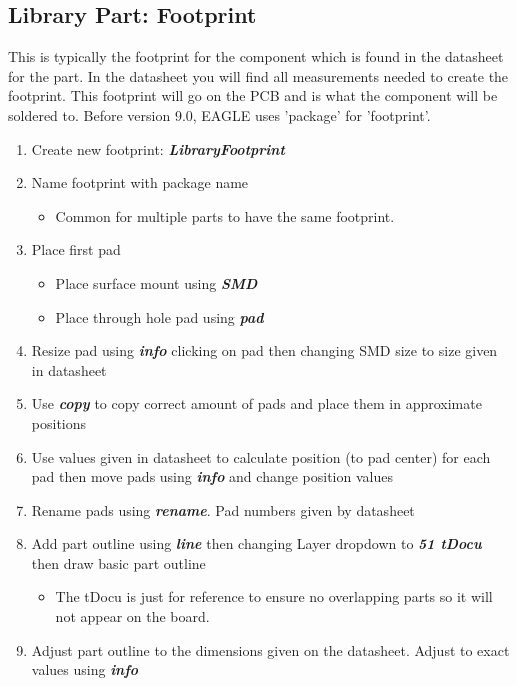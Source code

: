 \documentclass{article}
\begin{document}
\subsection{Library Part: Footprint}
This is typically the footprint for the component which is found in the datasheet for the part. In the datasheet you will find all measurements needed to create the footprint. This footprint will go on the PCB and is what the component will be soldered to. Before version 9.0, EAGLE uses 'package' for 'footprint'.  
\begin{enumerate}
    \item Create new footprint: \textit{\textbf{Library\textrightarrow Footprint}}
    \item Name footprint with package name
    \begin{itemize}
        \item Common for multiple parts to have the same footprint.
    \end{itemize}
    \item Place first pad
    \begin{itemize}
        \item Place surface mount using \textit{\textbf{SMD}}
        \item Place through hole pad using \textit{\textbf{pad}}
    \end{itemize}
    \item Resize pad using \textit{\textbf{info}} clicking on pad then changing SMD size to size given in datasheet
    \item Use \textit{\textbf{copy}} to copy correct amount of pads and place them in approximate positions
    \item Use values given in datasheet to calculate position (to pad center) for each pad then move pads using \textit{\textbf{info}} and change position values
    \item Rename pads using \textit{\textbf{rename}}. Pad numbers given by datasheet
    \item Add part outline using \textit{\textbf{line}} then changing Layer dropdown to \textit{\textbf{51 tDocu}} then draw basic part outline
    \begin{itemize}
        \item The tDocu is just for reference to ensure no overlapping parts so it will not appear on the board.
    \end{itemize}
    \item Adjust part outline to the dimensions given on the datasheet. Adjust to exact values using \textit{\textbf{info}}

\end{enumerate}
\end{document}
